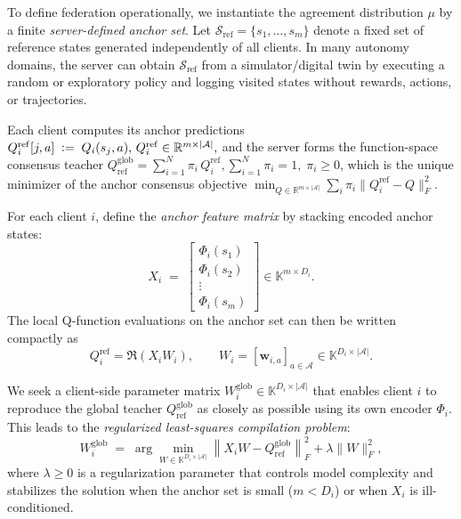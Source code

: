 To define federation operationally, we instantiate the agreement distribution $\mu$ by a finite \emph{server-defined anchor set}. Let $\mathcal{S}_{\mathrm{ref}}=\{s_1,\dots,s_m\}$ denote a fixed set of reference states generated independently of all clients. In many autonomy domains, the server can obtain $\mathcal{S}_{\mathrm{ref}}$ from a simulator/digital twin by executing a random or exploratory policy and logging visited states without rewards, actions, or trajectories.

Each client computes its anchor predictions $Q^{\mathrm{ref}}_i[j,a] \;\vcentcolon=\; Q_i(s_j,a),\, Q^{\mathrm{ref}}_i\in\mathbb{R}^{m\times|\mathcal{A}|},$
and the server forms the function-space consensus teacher
$Q^{\mathrm{glob}}_{\mathrm{ref}}=\sum_{i=1}^N \pi_i\, Q^{\mathrm{ref}}_i, \sum_{i=1}^N \pi_i=1,\;\pi_i\ge 0$,
which is the unique minimizer of the anchor consensus objective
$\min_{Q\in\mathbb{R}^{m\times|\mathcal{A}|}} \sum_i \pi_i \|Q^{\mathrm{ref}}_i - Q\|_F^2$.


For each client $i$, define the \emph{anchor feature matrix} by stacking encoded anchor states:
\begin{equation}
X_i \;=\; 
\begin{bmatrix}
\Phi_i(s_1) \\
\Phi_i(s_2) \\
\vdots \\
\Phi_i(s_m)
\end{bmatrix}
\in \mathbb{K}^{m \times D_i}.
\label{eq:anchor_matrix_i}
\end{equation}
The local Q-function evaluations on the anchor set can then be written compactly as
\begin{equation}
Q^{\mathrm{ref}}_i = \Re(X_i W_i),
\qquad W_i = [\mathbf{w}_{i,a}]_{a\in\mathcal{A}} \in \mathbb{K}^{D_i \times |\mathcal{A}|}.
\label{eq:anchor_q_matrix_form}
\end{equation}

We seek a client-side parameter matrix $W^{\mathrm{glob}}_i\in\mathbb{K}^{D_i\times|\mathcal{A}|}$ that enables client $i$ to reproduce the global teacher $Q^{\mathrm{glob}}_{\mathrm{ref}}$ as closely as possible using its own encoder $\Phi_i$. This leads to the \emph{regularized least-squares compilation problem}:
\begin{equation}
W^{\mathrm{glob}}_i \;=\; \arg\min_{W \in \mathbb{K}^{D_i \times |\mathcal{A}|}} 
\left\|X_i W - Q^{\mathrm{glob}}_{\mathrm{ref}}\right\|_F^2 
+ \lambda \|W\|_F^2,
\label{eq:regularized_compilation}
\end{equation}
where $\lambda \ge 0$ is a regularization parameter that controls model complexity and stabilizes the solution when the anchor set is small ($m < D_i$) or when $X_i$ is ill-conditioned.


